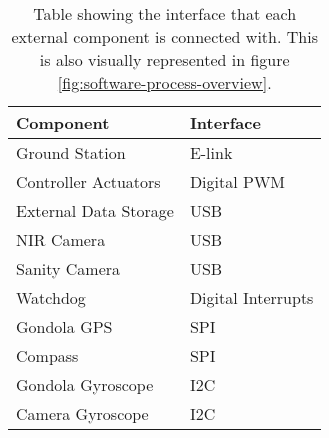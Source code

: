 \begin{table}[H]
	\centering
	\begin{tabular}{l|l}
		\textbf{Component}                                                          		& \textbf{Interface} \\ \hline
		Ground Station                                                              		& E-link             \\
		Controller Actuators                                                        		& Digital PWM        \\
		External Data Storage
		& USB            \\
		NIR Camera
		& USB                \\
		Sanity Camera
		& USB                \\
		Watchdog
		& Digital Interrupts \\
		Gondola GPS
		& SPI                \\
		Compass
		& SPI                \\
		Gondola Gyroscope
		& I2C                \\
		Camera Gyroscope   
		& I2C                \\
	\end{tabular}
	\caption{Table showing the interface that each external component is connected with. This is also visually represented in figure \ref{fig:software-process-overview}.}
	\label{tab:software-interfaces}
\end{table}
